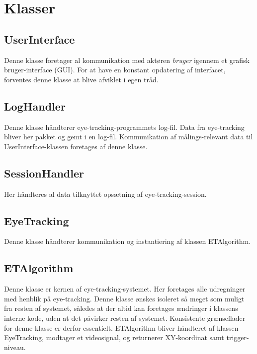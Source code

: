 \documentclass[softwarearkitektur.tex]{subfiles}
\begin{document}
\section{Klasser}

\subsection{UserInterface}
Denne klasse foretager al kommunikation med aktøren \textit{bruger} igennem et grafisk bruger-interface (GUI). For at have en konstant opdatering af interfacet, forventes denne klasse at blive afviklet i egen tråd. 

\subsection{LogHandler}
Denne klasse håndterer eye-tracking-programmets log-fil. Data fra eye-tracking bliver her pakket og gemt i en log-fil. Kommunikation af målings-relevant data til UserInterface-klassen foretages af denne klasse.

\subsection{SessionHandler}
Her håndteres al data tilknyttet opsætning af eye-tracking-session. 

\subsection{EyeTracking}
Denne klasse håndterer kommunikation og instantiering af klassen ETAlgorithm. 

\subsection{ETAlgorithm}
Denne klasse er kernen af eye-tracking-systemet. Her foretages alle udregninger med henblik på eye-tracking. Denne klasse ønskes isoleret så meget som muligt fra resten af systemet, således at der altid kan foretages ændringer i klassens interne kode, uden at det påvirker resten af systemet. Konsistente grænseflader for denne klasse er derfor essentielt. 
ETAlgorithm bliver håndteret af klassen EyeTracking, modtager et videosignal, og returnerer XY-koordinat samt trigger-niveau. 
\end{document}
